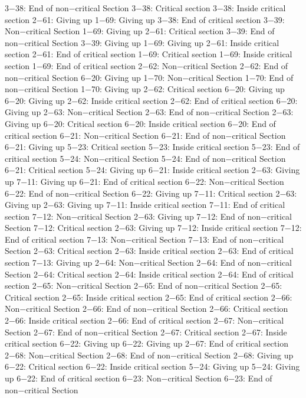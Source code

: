 3−38: End of non−critical Section
3−38: Critical section
3−38: Inside critical section
2−61: Giving up
1−69: Giving up
3−38: End of critical section
3−39: Non−critical Section
1−69: Giving up
2−61: Critical section
3−39: End of non−critical Section
3−39: Giving up
1−69: Giving up
2−61: Inside critical section
2−61: End of critical section
1−69: Critical section
1−69: Inside critical section
1−69: End of critical section
2−62: Non−critical Section
2−62: End of non−critical Section
6−20: Giving up
1−70: Non−critical Section
1−70: End of non−critical Section
1−70: Giving up
2−62: Critical section
6−20: Giving up
6−20: Giving up
2−62: Inside critical section
2−62: End of critical section
6−20: Giving up
2−63: Non−critical Section
2−63: End of non−critical Section
2−63: Giving up
6−20: Critical section
6−20: Inside critical section
6−20: End of critical section
6−21: Non−critical Section
6−21: End of non−critical Section
6−21: Giving up
5−23: Critical section
5−23: Inside critical section
5−23: End of critical section
5−24: Non−critical Section
5−24: End of non−critical Section
6−21: Critical section
5−24: Giving up
6−21: Inside critical section
2−63: Giving up
7−11: Giving up
6−21: End of critical section
6−22: Non−critical Section
6−22: End of non−critical Section
6−22: Giving up
7−11: Critical section
2−63: Giving up
2−63: Giving up
7−11: Inside critical section
7−11: End of critical section
7−12: Non−critical Section
2−63: Giving up
7−12: End of non−critical Section
7−12: Critical section
2−63: Giving up
7−12: Inside critical section
7−12: End of critical section
7−13: Non−critical Section
7−13: End of non−critical Section
2−63: Critical section
2−63: Inside critical section
2−63: End of critical section
7−13: Giving up
2−64: Non−critical Section
2−64: End of non−critical Section
2−64: Critical section
2−64: Inside critical section
2−64: End of critical section
2−65: Non−critical Section
2−65: End of non−critical Section
2−65: Critical section
2−65: Inside critical section
2−65: End of critical section
2−66: Non−critical Section
2−66: End of non−critical Section
2−66: Critical section
2−66: Inside critical section
2−66: End of critical section
2−67: Non−critical Section
2−67: End of non−critical Section
2−67: Critical section
2−67: Inside critical section
6−22: Giving up
6−22: Giving up
2−67: End of critical section
2−68: Non−critical Section
2−68: End of non−critical Section
2−68: Giving up
6−22: Critical section
6−22: Inside critical section
5−24: Giving up
5−24: Giving up
6−22: End of critical section
6−23: Non−critical Section
6−23: End of non−critical Section
